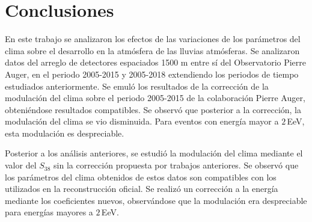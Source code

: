 \chapter{Conclusiones}



En este trabajo se analizaron los efectos de las variaciones de los parámetros del clima sobre el desarrollo en la atmósfera de las lluvias atmósferas. Se analizaron datos del arreglo de detectores espaciados 1500 m entre sí del Observatorio Pierre Auger, en el periodo 2005-2015 y 2005-2018 extendiendo los periodos de tiempo estudiados anteriormente. Se emuló los resultados de la corrección de la modulación del clima sobre el periodo 2005-2015 de la colaboración Pierre Auger, obteniéndose resultados compatibles. Se observó que posterior a la corrección, la modulación del clima se vio disminuida. Para eventos con energía mayor a $2\,$EeV, esta modulación es despreciable.

Posterior a los análisis anteriores, se estudió la modulación del clima mediante el valor del $S_{38}$ sin la corrección propuesta por trabajos anteriores. Se observó que los parámetros del clima obtenidos de estos datos son compatibles con los utilizados en la reconstrucción oficial. Se realizó un corrección a  la energía mediante los coeficientes nuevos, observándose que la modulación era despreciable para energías mayores a $2\,$EeV. 


